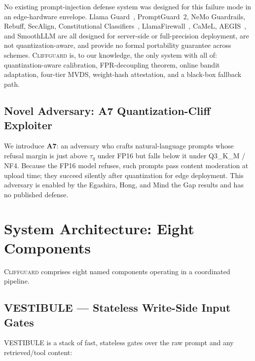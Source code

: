 \documentclass[11pt,a4paper]{article}
\newcommand{\tauq}{\tau_q}
\newcommand{\CG}{\textsc{Cliffguard}}
\begin{document}
No existing prompt-injection defense system was designed for this failure mode in
an edge-hardware envelope.
Llama Guard~\citep{inan2023llama_guard}, PromptGuard~2, NeMo Guardrails,
Rebuff, SecAlign, Constitutional Classifiers~\citep{sharma2025cc},
LlamaFirewall~\citep{llamafirewall2025}, CaMeL, AEGIS~\citep{ghosh2024aegis}, and
SmoothLLM are all designed for server-side or full-precision deployment, are not
quantization-aware, and provide no formal portability guarantee across schemes.
\CG{} is, to our knowledge, the only system with all of: quantization-aware
calibration, FPR-decoupling theorem, online bandit adaptation, four-tier MVDS,
weight-hash attestation, and a black-box fallback path.

\subsection{Novel Adversary: A7 Quantization-Cliff Exploiter}

We introduce \textbf{A7}: an adversary who crafts natural-language prompts whose
refusal margin is just above $\tauq$ under FP16 but falls below it under Q3\_K\_M
/ NF4.
Because the FP16 model refuses, such prompts pass content moderation at upload
time; they succeed silently after quantization for edge deployment.
This adversary is enabled by the Egashira, Hong, and Mind the Gap results and has
no published defense.

\section{System Architecture: Eight Components}
\label{sec:architecture}

\CG{} comprises eight named components operating in a coordinated pipeline.

\subsection{VESTIBULE — Stateless Write-Side Input Gates}

VESTIBULE is a stack of fast, stateless gates over the raw prompt and any
retrieved/tool content:
\end{document}
